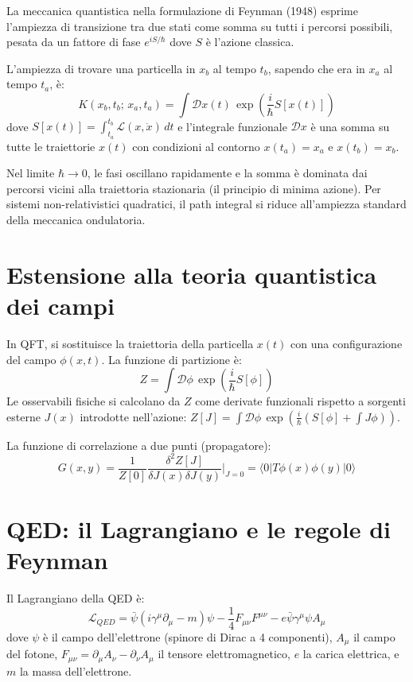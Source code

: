 \documentclass[11.5pt,a4paper,openany]{book}
\theoremstyle{remark}
\begin{document}
La meccanica quantistica nella formulazione di Feynman (1948) esprime l'ampiezza di transizione tra due stati come somma su tutti i percorsi possibili, pesata da un fattore di fase $e^{iS/\hbar}$ dove $S$ è l'azione classica.

L'ampiezza di trovare una particella in $x_b$ al tempo $t_b$, sapendo che era in $x_a$ al tempo $t_a$, è:
\[
K(x_b, t_b;\, x_a, t_a) = \int \mathcal{D}x(t)\, \exp\!\left(\frac{i}{\hbar} S[x(t)]\right)
\]
dove $S[x(t)] = \int_{t_a}^{t_b} \mathcal{L}(x, \dot{x})\, dt$ e l'integrale funzionale $\mathcal{D}x$ è una somma su tutte le traiettorie $x(t)$ con condizioni al contorno $x(t_a) = x_a$ e $x(t_b) = x_b$.

Nel limite $\hbar \to 0$, le fasi oscillano rapidamente e la somma è dominata dai percorsi vicini alla traiettoria stazionaria (il principio di minima azione). Per sistemi non-relativistici quadratici, il path integral si riduce all'ampiezza standard della meccanica ondulatoria.

\section{Estensione alla teoria quantistica dei campi}

In QFT, si sostituisce la traiettoria della particella $x(t)$ con una configurazione del campo $\phi(x, t)$. La funzione di partizione è:
\[
Z = \int \mathcal{D}\phi\, \exp\!\left(\frac{i}{\hbar} S[\phi]\right)
\]
Le osservabili fisiche si calcolano da $Z$ come derivate funzionali rispetto a sorgenti esterne $J(x)$ introdotte nell'azione: $Z[J] = \int \mathcal{D}\phi\, \exp\!\left(\frac{i}{\hbar}(S[\phi] + \int J\phi)\right)$.

La funzione di correlazione a due punti (propagatore):
\[
G(x, y) = \frac{1}{Z[0]}\frac{\delta^2 Z[J]}{\delta J(x)\delta J(y)}\bigg|_{J=0} = \langle 0|T\phi(x)\phi(y)|0\rangle
\]

\section{QED: il Lagrangiano e le regole di Feynman}

Il Lagrangiano della QED è:
\[
\mathcal{L}_{QED} = \bar{\psi}(i\gamma^\mu \partial_\mu - m)\psi - \frac{1}{4}F_{\mu\nu}F^{\mu\nu} - e\bar{\psi}\gamma^\mu\psi A_\mu
\]
dove $\psi$ è il campo dell'elettrone (spinore di Dirac a 4 componenti), $A_\mu$ il campo del fotone, $F_{\mu\nu} = \partial_\mu A_\nu - \partial_\nu A_\mu$ il tensore elettromagnetico, $e$ la carica elettrica, e $m$ la massa dell'elettrone.
\end{document}
